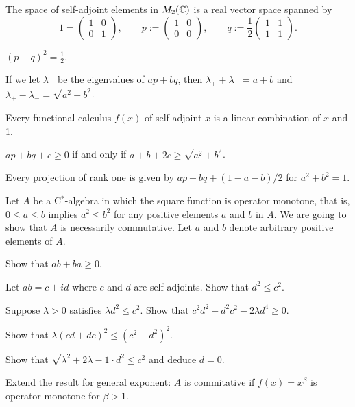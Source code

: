 \documentclass{../../large}
\begin{document}
\begin{prb}[Projections in $M_2(\C)$]
The space of self-adjoint elements in $M_2(\C)$ is a real vector space spanned by
\[1=\begin{pmatrix}1&0\\0&1\end{pmatrix},\qquad p:=\begin{pmatrix}1&0\\0&0\end{pmatrix},\qquad q:=\frac12\begin{pmatrix}1&1\\1&1\end{pmatrix}.\]
\begin{parts}
\item $(p-q)^2=\frac12$.
\item If we let $\lambda_\pm$ be the eigenvalues of $ap+bq$, then $\lambda_++\lambda_-=a+b$ and $\lambda_+-\lambda_-=\sqrt{a^2+b^2}$.
\item Every functional calculus $f(x)$ of self-adjoint $x$ is a linear combination of $x$ and 1.
\item $ap+bq+c\ge0$ if and only if $a+b+2c\ge\sqrt{a^2+b^2}$.
\item Every projection of rank one is given by $ap+bq+(1-a-b)/2$ for $a^2+b^2=1$.
\end{parts}
\end{prb}

\begin{prb}
Let $A$ be a C$^*$-algebra in which the square function is operator monotone, that is, $0\le a\le b$ implies $a^2\le b^2$ for any positive elements $a$ and $b$ in $A$.
We are going to show that $A$ is necessarily commutative.
Let $a$ and $b$ denote arbitrary positive elements of $A$.
\begin{parts}
\item
Show that $ab+ba\ge0$.
\item
Let $ab=c+id$ where $c$ and $d$ are self adjoints.
Show that $d^2\le c^2$.
\item
Suppose $\lambda>0$ satisfies $\lambda d^2\le c^2$.
Show that $c^2d^2+d^2c^2-2\lambda d^4\ge0$.
\item
Show that $\lambda(cd+dc)^2\le(c^2-d^2)^2$.
\item
Show that $\sqrt{\lambda^2+2\lambda-1}\cdot d^2\le c^2$ and deduce $d=0$.
\item
Extend the result for general exponent: $A$ is commitative if $f(x)=x^\beta$ is operator monotone for $\beta>1$.
\end{parts}
\end{prb}
\end{document}
